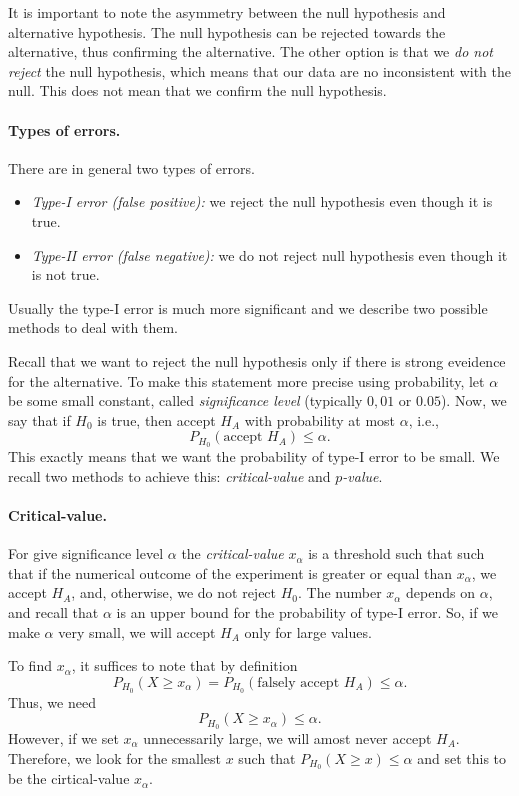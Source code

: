 \begin{remark}
It is important to note the asymmetry between the null hypothesis and alternative hypothesis.
The null hypothesis can be rejected towards the alternative, thus confirming the alternative.
The other option is that we \emph{do not reject} the null hypothesis, which means that our data are no inconsistent with the null.
This does not mean that we confirm the null hypothesis.
\end{remark}

\paragraph{Types of errors.}
There are in general two types of errors.
\begin{itemize}
\item
\emph{Type-I error (false positive):} we reject the null hypothesis even though it is true.
\item
\emph{Type-II error (false negative):}  we do not reject null hypothesis even though it is not true.
\end{itemize}
Usually the type-I error is much more significant and we describe two possible methods to deal with them.

Recall that we want to reject the null hypothesis only if there is strong eveidence for the alternative.
To make this statement more precise using probability, let $\alpha$ be some small constant, called \emph{significance level} (typically $0,01$ or $0.05$).
Now, we say that if $H_0$ is true, then accept $H_A$ with probability at most $\alpha$, i.e.,
$$P_{H_0}(\text{accept $H_A$}) \leq \alpha.$$
This exactly means that we want the probability of type-I error to be small.
We recall two methods to achieve this: \emph{critical-value} and \emph{$p$-value}.

\paragraph{Critical-value.}
For give significance level $\alpha$ the \emph{critical-value} $x_\alpha$ is a threshold such that such that if the numerical outcome of the experiment is greater or equal than $x_\alpha$, we accept $H_A$, and, otherwise, we do not reject $H_0$.
The number $x_\alpha$ depends on $\alpha$, and recall that $\alpha$ is an upper bound for the probability of type-I error.
So, if we make $\alpha$ very small, we will accept $H_A$ only for large values.

To find $x_\alpha$, it suffices to note that by definition
$$P_{H_0}(X\geq x_\alpha) = P_{H_0}(\text{falsely accept $H_A$}) \leq \alpha.$$
Thus, we need
$$P_{H_0}(X\geq x_\alpha) \leq \alpha.$$
However, if we set $x_\alpha$ unnecessarily large, we will amost never accept $H_A$.
Therefore, we look for the smallest $x$ such that $P_{H_0}(X \geq x) \leq \alpha$ and set this to be the cirtical-value $x_\alpha$.


